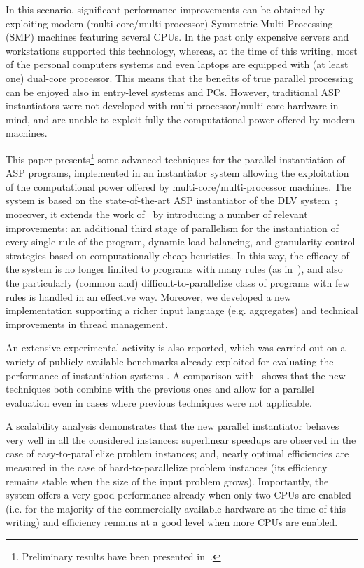 \documentclass[preprint]{tlp}
\newcommand{\dlv}{{\sc DLV}\xspace}
\begin{document}
In this scenario, significant performance improvements can be obtained
by exploiting modern (multi-core/multi-processor) Symmetric Multi Processing (SMP) \cite{stall-98} machines
featuring several CPUs.
In the past only expensive servers and workstations supported this technology, whereas,
at the time of this writing, most of the personal computers systems
and even laptops are equipped with (at least one) dual-core processor.
This means that the benefits of true parallel processing can
be enjoyed also in entry-level systems and PCs.
However, traditional ASP instantiators were not developed with
multi-processor/multi-core hardware in mind, and are unable to
exploit fully the computational power offered by modern machines.

This paper presents\footnote{Preliminary results have been presented in~\cite{perr-etal-2008,perr-etal-2010-damp}.}
some advanced techniques for the parallel instantiation
of ASP programs, implemented in an instantiator system allowing the exploitation of the computational power
offered by multi-core/multi-processor machines.
The system is based on the state-of-the-art ASP instantiator
of the \dlv system~\cite{leon-etal-2002-dlv}; moreover, it
extends the work of~\cite{cali-etal-2008-joacil}
 by introducing a number of relevant improvements:
 an additional third stage of parallelism for the instantiation of every single rule of the program,
 dynamic load balancing, and  granularity control strategies
based on computationally cheap heuristics.
In this way, the efficacy of the system is no longer limited to programs with
many rules (as in~\cite{cali-etal-2008-joacil}), and also  the particularly
(common and) difficult-to-parallelize class of programs with few rules
is handled in an effective way.
Moreover, we developed a new implementation supporting a richer input language (e.g. aggregates)
and technical improvements in thread management.

An extensive experimental activity is also reported, which was carried out on a variety
of publicly-available benchmarks already exploited for evaluating the performance of instantiation systems \cite{gebs-etal-2007-lpnmr-competition,devebogetr09a,leon-etal-2002-dlv}.
A comparison with~\cite{cali-etal-2008-joacil} shows that the new techniques
both combine with the previous ones and allow for a parallel evaluation
even in cases where previous techniques were not applicable.


A scalability analysis demonstrates that the new parallel instantiator behaves very well in all the considered
instances: superlinear speedups are observed in the case of easy-to-parallelize problem instances; and,
nearly optimal efficiencies are measured in the case of hard-to-parallelize problem instances
(its efficiency remains stable when the size of the input problem grows).
Importantly, the system offers a very good performance already when only two CPUs are enabled
(i.e. for the majority of the commercially available hardware at the time of this writing)
and efficiency remains at a good level when more CPUs are enabled.
\end{document}
